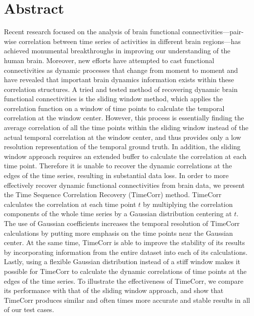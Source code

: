 \documentclass[11pt]{article}
\begin{document}
\section{Abstract}
Recent research focused on the analysis of brain functional connectivities---pair-wise correlation between time series of activities in different brain regions---has achieved monumental breakthroughs in improving our understanding of the human brain. Moreover, new efforts have attempted to cast functional connectivities as dynamic processes that change from moment to moment and have revealed that important brain dynamics information exists within these correlation structures. A tried and tested method of recovering dynamic brain functional connectivities is the sliding window method, which applies the correlation function on a window of time points to calculate the temporal correlation at the window center. However, this process is essentially finding the average correlation of all the time points within the sliding window instead of the actual temporal correlation at the window center, and thus provides only a low resolution representation of the temporal ground truth. In addition, the sliding window approach requires an extended buffer to calculate the correlation at each time point. Therefore it is unable to recover the dynamic correlations at the edges of the time series, resulting in substantial data loss. In order to more effectively recover dynamic functional connectivities from brain data, we present the Time Sequence Correlation Recovery (TimeCorr) method. TimeCorr calculates the correlation at each time point $t$ by multiplying the correlation components of the whole time series by a Gaussian distribution centering at $t$. The use of Gaussian coefficients increases the temporal resolution of TimeCorr calculations by putting more emphasis on the time points near the Gaussian center. At the same time, TimeCorr is able to improve the stability of its results by incorporating information from the entire dataset into each of its calculations. Lastly, using a flexible Gaussian distribution instead of a stiff window makes it possible for TimeCorr to calculate the dynamic correlations of time points at the edges of the time series. To illustrate the effectiveness of TimeCorr, we compare its performance with that of the sliding window approach, and show that TimeCorr produces similar and often times more accurate and stable results in all of our test cases.

\newpage
\end{document}
